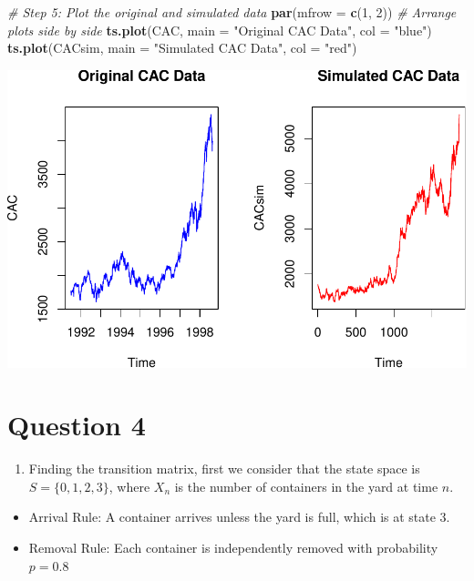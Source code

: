 \documentclass[
]{article}
\newenvironment{Shaded}{\begin{snugshade}}{\end{snugshade}}
\newcommand{\AttributeTok}[1]{\textcolor[rgb]{0.13,0.29,0.53}{#1}}
\newcommand{\CommentTok}[1]{\textcolor[rgb]{0.56,0.35,0.01}{\textit{#1}}}
\newcommand{\DecValTok}[1]{\textcolor[rgb]{0.00,0.00,0.81}{#1}}
\newcommand{\FunctionTok}[1]{\textcolor[rgb]{0.13,0.29,0.53}{\textbf{#1}}}
\newcommand{\NormalTok}[1]{#1}
\newcommand{\StringTok}[1]{\textcolor[rgb]{0.31,0.60,0.02}{#1}}
\providecommand{\tightlist}{%
  \setlength{\itemsep}{0pt}\setlength{\parskip}{0pt}}
\begin{document}
\begin{Shaded}
\begin{Highlighting}[]
\CommentTok{\# Step 5: Plot the original and simulated data}
\FunctionTok{par}\NormalTok{(}\AttributeTok{mfrow =} \FunctionTok{c}\NormalTok{(}\DecValTok{1}\NormalTok{, }\DecValTok{2}\NormalTok{)) }\CommentTok{\# Arrange plots side by side}
\FunctionTok{ts.plot}\NormalTok{(CAC, }\AttributeTok{main =} \StringTok{"Original CAC Data"}\NormalTok{, }\AttributeTok{col =} \StringTok{"blue"}\NormalTok{)}
\FunctionTok{ts.plot}\NormalTok{(CACsim, }\AttributeTok{main =} \StringTok{"Simulated CAC Data"}\NormalTok{, }\AttributeTok{col =} \StringTok{"red"}\NormalTok{)}
\end{Highlighting}
\end{Shaded}

\includegraphics{a4_files/figure-latex/unnamed-chunk-3-2.pdf}

\section{Question 4}\label{question-4}

\begin{enumerate}
\def\labelenumi{(\alph{enumi})}
\tightlist
\item
  Finding the transition matrix, first we consider that the state space
  is \(S = \{0, 1, 2, 3\}\), where \(X_n\) is the number of containers
  in the yard at time \(n\).
\end{enumerate}

\begin{itemize}
\tightlist
\item
  Arrival Rule: A container arrives unless the yard is full, which is at
  state 3.
\item
  Removal Rule: Each container is independently removed with probability
  \(p = 0.8\)
\end{itemize}
\end{document}

